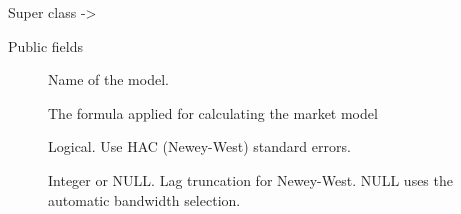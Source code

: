 \documentclass[a4paper]{book}
\begin{document}
%
\begin{Section}{Super class}
 -> 
\end{Section}
%
\begin{Section}{Public fields}

\begin{description}

\item[] Name of the model.

\item[] The formula applied for calculating the market model

\item[] Logical. Use HAC (Newey-West) standard errors.

\item[] Integer or NULL. Lag truncation for Newey-West.
NULL uses the automatic bandwidth selection.

\end{description}


\end{Section}
%
\end{document}
